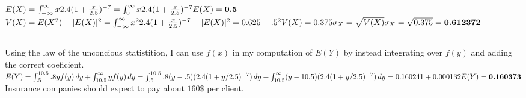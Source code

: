 \documentclass[12pt, letterpaper]{article}
\begin{document}
\subsection{}
\begin{center}
\end{center}
\subsection{}
\(
E(X) = \int_{-\infty}^{\infty} x2.4(1 + \frac{x}{2.5})^{-7} \\
= \int_{0}^{\infty} x2.4(1 + \frac{x}{2.5})^{-7} \\
E(X) = \textbf{0.5} \\
\)
\(
V(X) = E(X^{2}) - [E(X)]^{2} \\
= \int_{-\infty}^{\infty} x^{2}2.4(1 + \frac{x}{2.5})^{-7} - [E(X)]^{2} \\
= 0.625 - .5^{2} \\
V(X) = 0.375 \\
\sigma_{X} = \sqrt{V(X)} \\
\sigma_{X} = \sqrt{0.375} = \textbf{0.612372} \\
\)
\subsection{}
Using the law of the unconcious statistition, I can use $f(x)$ in my computation of $E(Y)$ by instead integrating over $f(y)$ and adding the correct coeficient.
\newline
\(
E(Y) = \int_{.5}^{10.5} .8yf(y)\, dy + \int_{10.5}^{\infty} yf(y)\, dy \\
= \int_{.5}^{10.5} .8(y-.5)(2.4(1 + y/2.5)^{-7})\, dy +
\int_{10.5}^{\infty} (y-10.5)(2.4(1 + y/2.5)^{-7})\, dy \\
= 0.160241 + 0.000132 \\
E(Y) = \textbf{0.160373} \\
\)
Insurance companies should expect to pay about $160\$$ per client.
\newline
\end{document}
